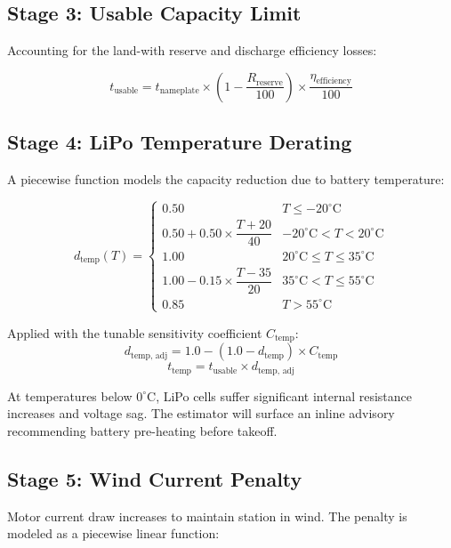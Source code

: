\documentclass[11pt,a4paper]{article}
\begin{document}
\subsection{Stage 3: Usable Capacity Limit}
Accounting for the land-with reserve and discharge efficiency losses:

\begin{equation}
    t_{\text{usable}} = t_{\text{nameplate}} \times \left(1 - \frac{R_{\text{reserve}}}{100}\right) \times \frac{\eta_{\text{efficiency}}}{100}
\end{equation}

\subsection{Stage 4: LiPo Temperature Derating}
A piecewise function models the capacity reduction due to battery temperature:

\begin{equation}
    d_{\text{temp}}(T) =
    \begin{cases}
        0.50 & T \leq -20^{\circ}\text{C} \\
        0.50 + 0.50 \times \dfrac{T + 20}{40} & -20^{\circ}\text{C} < T < 20^{\circ}\text{C} \\
        1.00 & 20^{\circ}\text{C} \leq T \leq 35^{\circ}\text{C} \\
        1.00 - 0.15 \times \dfrac{T - 35}{20} & 35^{\circ}\text{C} < T \leq 55^{\circ}\text{C} \\
        0.85 & T > 55^{\circ}\text{C}
    \end{cases}
\end{equation}

Applied with the tunable sensitivity coefficient $C_{\text{temp}}$:
\begin{equation}
    d_{\text{temp, adj}} = 1.0 - (1.0 - d_{\text{temp}}) \times C_{\text{temp}}
\end{equation}
\begin{equation}
    t_{\text{temp}} = t_{\text{usable}} \times d_{\text{temp, adj}}
\end{equation}

\begin{warnbox}
    At temperatures below $0^{\circ}$C, LiPo cells suffer significant internal resistance increases and voltage sag. The estimator will surface an inline advisory recommending battery pre-heating before takeoff.
\end{warnbox}

\subsection{Stage 5: Wind Current Penalty}
Motor current draw increases to maintain station in wind. The penalty is modeled as a piecewise linear function:
\end{document}
